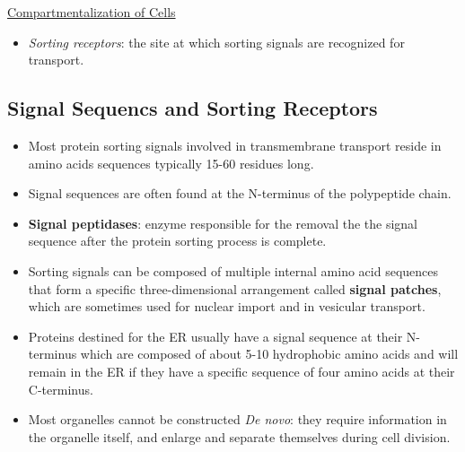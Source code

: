 \documentclass[12pt,letterpaper]{article}
\begin{document}
\begin{secbox}{\hyperlink{12}{Compartmentalization of Cells}}
{\begin{itemize}
\begin{multicols}{2}
\begin{center}
        \end{center}
        \end{multicols}
        \item \textit{Sorting receptors}: the site at which sorting signals are recognized for transport.
    \end{itemize}

    \hypertarget{12.1.3}{\subsection*{Signal Sequencs and Sorting Receptors}}
    \begin{itemize}
        \item Most protein sorting signals involved in transmembrane transport reside in amino acids sequences typically 15-60 residues long.
        \item Signal sequences are often found at the N-terminus of the polypeptide chain. 
        \item \textbf{Signal peptidases}: enzyme responsible for the removal the the signal sequence after the protein sorting process is complete.
        \item Sorting signals can be composed of multiple internal amino acid sequences that form a specific three-dimensional arrangement called \textbf{signal patches}, which are sometimes used for nuclear import and in vesicular transport.
        \item Proteins destined for the ER usually have a signal sequence at their N-terminus which are composed of about 5-10 hydrophobic amino acids and will remain in the ER if they have a specific sequence of four amino acids at their C-terminus.
        \item Most organelles cannot be constructed \textit{De novo}: they require information in the organelle itself, and enlarge and separate themselves during cell division. 
    \end{itemize}

    \hypertarget{12.1.r}{}

}
\end{secbox}
\end{document}
